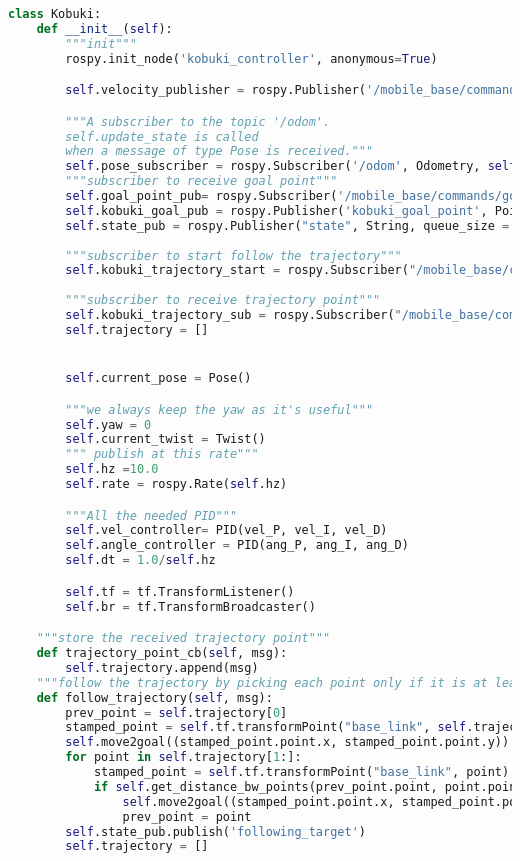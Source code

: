 \begin{lstlisting}[caption={Kobuki Class},label={lst:kobukiclass},language=Python]
class Kobuki:
    def __init__(self):
        """init"""
        rospy.init_node('kobuki_controller', anonymous=True)

        self.velocity_publisher = rospy.Publisher('/mobile_base/commands/velocity', Twist, queue_size=10)

        """A subscriber to the topic '/odom'. 
        self.update_state is called
        when a message of type Pose is received."""
        self.pose_subscriber = rospy.Subscriber('/odom', Odometry, self.update_state)
        """subscriber to receive goal point"""
        self.goal_point_pub= rospy.Subscriber('/mobile_base/commands/goal_point', PointStamped, self.goal_point_cb)
        self.kobuki_goal_pub = rospy.Publisher('kobuki_goal_point', PointStamped, queue_size=10)
        self.state_pub = rospy.Publisher("state", String, queue_size = 1)
        
        """subscriber to start follow the trajectory"""
        self.kobuki_trajectory_start = rospy.Subscriber("/mobile_base/commands/trajectory_start", Empty, self.follow_trajectory)
        
        """subscriber to receive trajectory point"""
        self.kobuki_trajectory_sub = rospy.Subscriber("/mobile_base/commands/trajectory_point", PointStamped, self.trajectory_point_cb)
        self.trajectory = []


        self.current_pose = Pose()

        """we always keep the yaw as it's useful"""
        self.yaw = 0
        self.current_twist = Twist()
        """ publish at this rate"""
        self.hz =10.0
        self.rate = rospy.Rate(self.hz)

        """All the needed PID"""
        self.vel_controller= PID(vel_P, vel_I, vel_D)
        self.angle_controller = PID(ang_P, ang_I, ang_D)
        self.dt = 1.0/self.hz

        self.tf = tf.TransformListener()
        self.br = tf.TransformBroadcaster()

    """store the received trajectory point"""
    def trajectory_point_cb(self, msg):
        self.trajectory.append(msg)
    """follow the trajectory by picking each point only if it is at least at 20cm from the previous one"""
    def follow_trajectory(self, msg):
        prev_point = self.trajectory[0]
        stamped_point = self.tf.transformPoint("base_link", self.trajectory[0])
        self.move2goal((stamped_point.point.x, stamped_point.point.y))
        for point in self.trajectory[1:]:
            stamped_point = self.tf.transformPoint("base_link", point)
            if self.get_distance_bw_points(prev_point.point, point.point)>= 0.20:
                self.move2goal((stamped_point.point.x, stamped_point.point.y))
                prev_point = point
        self.state_pub.publish('following_target')
        self.trajectory = []


\end{lstlisting}
